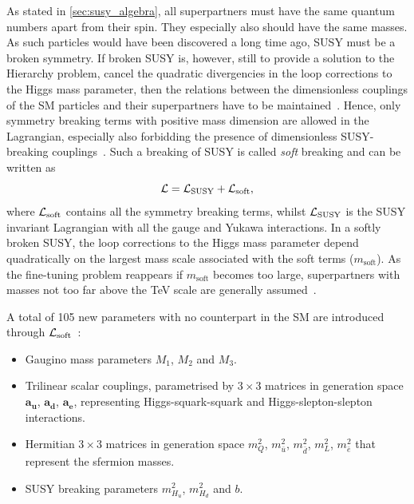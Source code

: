 As stated in \cref{sec:susy_algebra}, all superpartners must have the same quantum numbers apart from their spin. They especially also should have the same masses. As such particles would have been discovered a long time ago, SUSY must be a broken symmetry. If broken SUSY is, however, still to provide a solution to the Hierarchy problem, \ie cancel the quadratic divergencies in the loop corrections to the Higgs mass parameter, then the relations between the dimensionless couplings of the SM particles and their superpartners have to be maintained~\cite{Martin:1997ns}. Hence, only symmetry breaking terms with positive mass dimension are allowed in the Lagrangian, especially also forbidding the presence of dimensionless SUSY-breaking couplings~\cite{Martin:1997ns}. Such a breaking of SUSY is called \textit{soft} breaking and can be written as
\begin{equation}
	\mathcal{L} = \mathcal{L}_\mathrm{SUSY} + \mathcal{L}_\mathrm{soft},
\end{equation}
where $\mathcal{L}_\mathrm{soft}$ contains all the symmetry breaking terms, whilst $\mathcal{L}_\mathrm{SUSY}$ is the SUSY invariant Lagrangian with all the gauge and Yukawa interactions. In a softly broken SUSY, the loop corrections to the Higgs mass parameter depend quadratically on the largest mass scale associated with the soft terms ($m_\mathrm{soft}$). As the fine-tuning problem reappears if $m_\mathrm{soft}$ becomes too large, superpartners with masses not too far above the TeV scale are generally assumed~\cite{Martin:1997ns}.

A total of 105 new parameters with no counterpart in the SM are introduced through $\mathcal{L}_\mathrm{soft}$~\cite{Martin:1997ns,Dimopoulos:1995ju}:
\begin{itemize}
	\item Gaugino mass parameters $M_1$, $M_2$ and $M_3$.
	\item Trilinear scalar couplings, parametrised by $3\times 3$ matrices in generation space $\boldsymbol{a_u}$, $\boldsymbol{a_d}$, $\boldsymbol{a_e}$, representing Higgs-squark-squark and Higgs-slepton-slepton interactions.
	\item Hermitian $3\times 3$ matrices in generation space \boldmath $m_Q^2$, $m^2_{\bar{u}}$, $m^2_{\bar{d}}$, $m^2_L$, $m^2_{\bar{e}}$ \unboldmath that represent the sfermion masses.
	\item SUSY breaking parameters $m^2_{H_u}$, $m^2_{H_d}$ and $b$.
\end{itemize}

